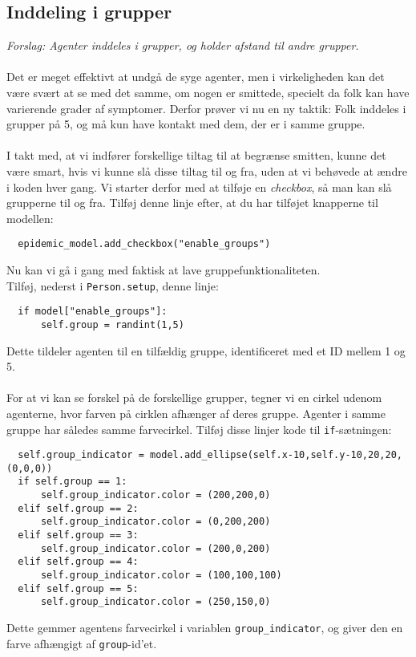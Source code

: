 \documentclass{article}
\begin{document}
\subsection{Inddeling i grupper}
\textit{Forslag: Agenter inddeles i grupper, og holder afstand til andre grupper.}\\\\
Det er meget effektivt at undgå de syge agenter, men i virkeligheden kan det være svært at se med det samme, om nogen er smittede, specielt da folk kan have varierende grader af symptomer. Derfor prøver vi nu en ny taktik: Folk inddeles i grupper på 5, og må kun have kontakt med dem, der er i samme gruppe.\\\\
I takt med, at vi indfører forskellige tiltag til at begrænse smitten, kunne det være smart, hvis vi kunne slå disse tiltag til og fra, uden at vi behøvede at ændre i koden hver gang. Vi starter derfor med at tilføje en \textit{checkbox}, så man kan slå grupperne til og fra. Tilføj denne linje efter, at du har tilføjet knapperne til modellen:
\begin{lstlisting}
  epidemic_model.add_checkbox("enable_groups")
\end{lstlisting}
Nu kan vi gå i gang med faktisk at lave gruppefunktionaliteten.\\
Tilføj, nederst i \texttt{Person.setup}, denne linje:
\begin{lstlisting}
  if model["enable_groups"]:
      self.group = randint(1,5)
\end{lstlisting}
Dette tildeler agenten til en tilfældig gruppe, identificeret med et ID mellem 1 og 5.\\\\
For at vi kan se forskel på de forskellige grupper, tegner vi en cirkel udenom agenterne, hvor farven på cirklen afhænger af deres gruppe. Agenter i samme gruppe har således samme farvecirkel. Tilføj disse linjer kode til \texttt{if}-sætningen:
\begin{lstlisting}
  self.group_indicator = model.add_ellipse(self.x-10,self.y-10,20,20,(0,0,0))
  if self.group == 1:
      self.group_indicator.color = (200,200,0)
  elif self.group == 2:
      self.group_indicator.color = (0,200,200)
  elif self.group == 3:
      self.group_indicator.color = (200,0,200)
  elif self.group == 4:
      self.group_indicator.color = (100,100,100)
  elif self.group == 5:
      self.group_indicator.color = (250,150,0)
\end{lstlisting}
Dette gemmer agentens farvecirkel i variablen \texttt{group\_indicator}, og giver den en farve afhængigt af \texttt{group}-id'et.\\\\
\end{document}
